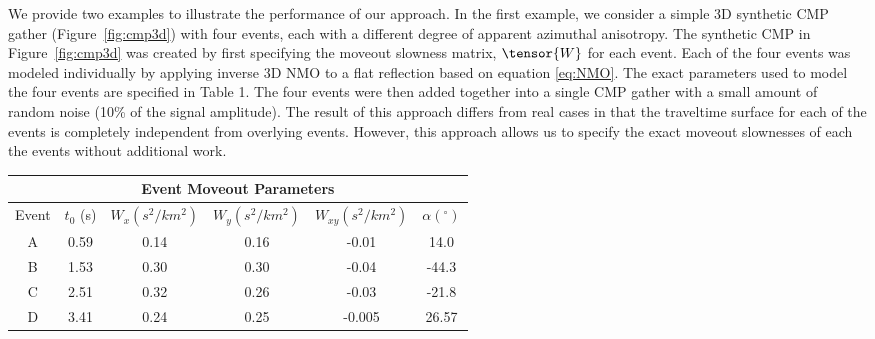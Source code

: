 We provide two examples to illustrate the performance of our approach.  In the first example, we consider a simple 3D synthetic CMP gather (Figure~\ref{fig:cmp3d}) with four events, each with a different degree of apparent azimuthal anisotropy. The synthetic CMP in Figure~\ref{fig:cmp3d} was created by first specifying the moveout slowness matrix, $\tensor{W}$ for each event.  Each of the four events was modeled individually by applying inverse 3D NMO to a flat reflection based on equation \ref{eq:NMO}.  The exact parameters used to model the four events are specified in Table 1.  The four events were then added together into a single CMP gather with a small amount of random noise (10\% of the signal amplitude).  The result of this approach differs from real cases in that the traveltime surface for each of the events is completely independent from overlying events.  However, this approach allows us to specify the exact moveout slownesses of each the events without additional work.  

 {
    \begin{center}
     \begin{tabular}{|c|c|c|c|c|c|}
      \hline \multicolumn{6}{|c|}{Event Moveout Parameters} \\ 
      \hline Event & $t_0$ (s) &  $W_x (s^2/km^2)$ & $W_y (s^2/km^2)$ & $W_{xy} (s^2/km^2)$ & $\alpha (^\circ )$ \\ 
      \hline A  & 0.59 & 0.14 & 0.16 & -0.01 & 14.0 \\ 
      \hline B  & 1.53 & 0.30 & 0.30 & -0.04 & -44.3 \\  
      \hline C  & 2.51 & 0.32 & 0.26 & -0.03 & -21.8 \\ 
      \hline D  & 3.41 & 0.24 & 0.25 & -0.005 & 26.57 \\ 
      \hline
    \end{tabular} 
   \end{center}
} 

